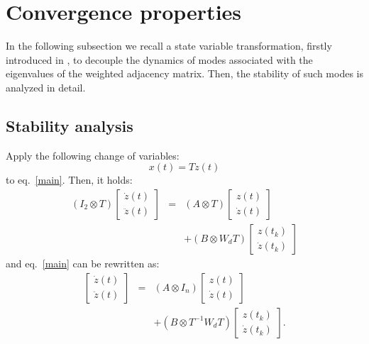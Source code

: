 \documentclass[conference]{IEEEtran}
\begin{document}
\section{Convergence properties}\label{main_res_1}

In the following subsection we recall a state variable transformation, firstly introduced in \cite{ETFA2014}, to decouple the dynamics of modes associated with the eigenvalues of the weighted adjacency matrix. Then, the stability of such modes is analyzed in detail.

\subsection{Stability analysis}

Apply the following change of variables:
\begin{equation}
x(t)=T z(t)
\end{equation}
to eq.~\eqref{main}. Then, it holds:
\begin{equation}\label{transformed}
\begin{array}{lll}
(I_2 \otimes T)\left[\begin{array}{c}
\dot{z}(t) \\
\ddot{z}(t)
\end{array} \right] & = & (A\otimes  T)\left[\begin{array}{c}
{z}(t) \\
{\dot{z}}(t)
\end{array}\right] \\ & & +(B\otimes W_d T)\left[\begin{array}{c}
{z(t_k)} \\
{\dot{z}(t_k)}
\end{array}\right]
\end{array}
\end{equation}
and eq.~\eqref{main} can be rewritten as:
\begin{equation}\label{eq1_c}
\begin{array}{lll}
\left[\begin{array}{c}
\dot{z}(t) \\
\ddot{z}(t)
\end{array} \right] & = & (A\otimes I_n)\left[\begin{array}{c}
{z}(t) \\
{\dot{z}}(t)
\end{array}\right] \\ & & +(B\otimes T^{-1}W_d T)\left[\begin{array}{c}
{z(t_k)} \\
{\dot{z}(t_k)}
\end{array}\right].
\end{array}
\end{equation}
\end{document}
